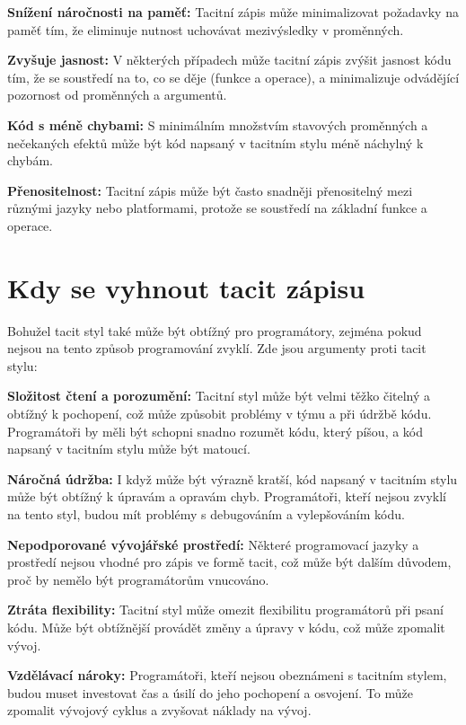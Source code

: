 \documentclass[male,czech]{kithesis}
\begin{document}
\textbf{Snížení náročnosti na paměť:}
Tacitní zápis může minimalizovat požadavky na paměť tím, 
že eliminuje nutnost uchovávat mezivýsledky v proměnných.

\textbf{Zvyšuje jasnost:}
V některých případech může tacitní zápis zvýšit jasnost kódu tím, 
že se soustředí na to, co se děje (funkce a operace), 
a minimalizuje odvádějící pozornost od proměnných a argumentů.

\textbf{Kód s méně chybami:}
S minimálním množstvím stavových proměnných a 
nečekaných efektů může být kód napsaný v tacitním stylu méně náchylný k chybám.

\textbf{Přenositelnost:}
Tacitní zápis může být často snadněji přenositelný mezi různými jazyky nebo platformami, 
protože se soustředí na základní funkce a operace.


\section{Kdy se vyhnout tacit zápisu}

Bohužel tacit styl také může být obtížný pro programátory, 
zejména pokud nejsou na tento způsob programování zvyklí. 
Zde jsou argumenty proti tacit stylu:

\textbf{Složitost čtení a porozumění:} 
Tacitní styl může být velmi těžko čitelný a obtížný k pochopení, 
což může způsobit problémy v týmu a při údržbě kódu. 
Programátoři by měli být schopni snadno rozumět kódu,
který píšou, a kód napsaný v tacitním stylu může být matoucí.

\textbf{Náročná údržba:}
I když může být výrazně kratší, 
kód napsaný v tacitním stylu může být obtížný k úpravám a opravám chyb. 
Programátoři, kteří nejsou zvyklí na tento styl, 
budou mít problémy s debugováním a vylepšováním kódu.

\textbf{Nepodporované vývojářské prostředí:}
Některé programovací jazyky a prostředí nejsou vhodné pro zápis ve formě tacit, 
což může být dalším důvodem, proč by nemělo být programátorům vnucováno.

\textbf{Ztráta flexibility:}
Tacitní styl může omezit flexibilitu programátorů při psaní kódu.
Může být obtížnější provádět změny a úpravy v kódu, což může zpomalit vývoj.

\textbf{Vzdělávací nároky:}
Programátoři, kteří nejsou obeznámeni s tacitním stylem, 
budou muset investovat čas a úsilí do jeho pochopení a osvojení. 
To může zpomalit vývojový cyklus a zvyšovat náklady na vývoj.
\end{document}
